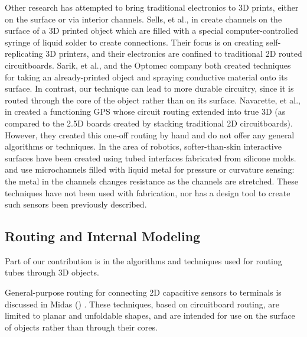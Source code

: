 Other research has attempted to bring traditional electronics to 3D prints, either on the surface or via interior channels.  Sells, et al., in \cite{Sells-reprap} create channels on the surface of a 3D printed object which are filled with a special computer-controlled syringe of liquid solder to create connections.  Their focus is on creating self-replicating 3D printers, and their electronics are confined to traditional 2D routed circuitboards.  Sarik, et al., \cite{Sarik-tracebrush}  and the Optomec company \cite{optomec} both created techniques for taking an already-printed object and spraying conductive material onto its surface.  In contrast, our technique can lead to more durable circuitry, since it is routed through the core of the object rather than on its surface.  Navarette, et al., in \cite{Navarrette-gps} created a functioning GPS whose circuit routing extended into true 3D (as compared to the 2.5D boards created by stacking traditional 2D circuitboards).  However, they created this one-off routing by hand and do not offer any general algorithms or techniques.  In the area of robotics, softer-than-skin interactive surfaces have been created using tubed interfaces fabricated from silicone molds.  \cite{Park-microchannels} and \cite{Majidi-curvature} use microchannels filled with liquid metal for pressure or curvature sensing: the metal in the channels changes resistance as the channels are stretched.  These techniques have not been used with fabrication, nor has a design tool to create such sensors been previously described.

\subsection{Routing and Internal Modeling}

Part of our contribution is in the algorithms and techniques used for routing tubes through 3D objects.

General-purpose routing for connecting 2D capacitive sensors to terminals is discussed in Midas (\cite{Savage-midas}) .  These techniques, based on circuitboard routing, are limited to planar and unfoldable shapes, and are intended for use on the surface of objects rather than through their cores.

